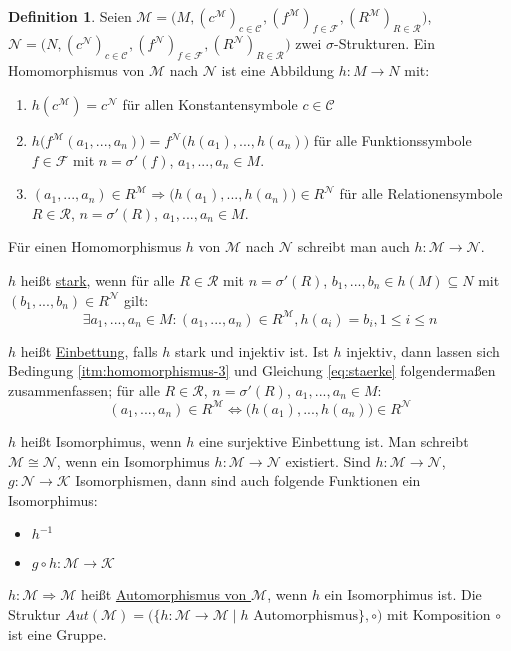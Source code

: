 \documentclass{article}
\theoremstyle{definition}
\newtheorem{dfn}{Definition}[section]
\theoremstyle{plain}
\newcommand{\m}[1]{\mathcal{#1}}
\newcommand{\struc}[3]{\big(#1, (c^{#2})_{c \in \m{C}_{#3}}, (f^{#2})_{f \in \m{F}_{#3}}, (R^{#2})_{R \in \m{R}_{#3}}\big)}
\begin{document}
    \begin{dfn}
        Seien $ \m{M} = \struc{M}{\m{M}}{} $, $ \m{N} = \struc{N}{\m{N}}{} $ zwei $ \sigma $-Strukturen.
        Ein Homomorphismus von $ \m{M} $ nach $ \m{N} $ ist eine Abbildung $ h : M \rightarrow N $ mit:
        \begin{enumerate}
            \item $ h(c^\m{M}) = c^\m{N} $ für allen Konstantensymbole $ c \in \m{C} $
            \item $ h\big(f^\m{M}(a_1, ..., a_n)\big) = f^\m{N}\big(h(a_1), ..., h(a_n)\big) $ für alle Funktionssymbole $ f \in \m{F} $ mit $ n = \sigma'(f) $, $ a_1, ..., a_n \in M $.
            \item \label{itm:homomorphismus-3} $ (a_1, ..., a_n) \in R^\m{M} \Rightarrow \big(h(a_1), ..., h(a_n)) \in R^\m{N} $ für alle Relationensymbole $ R \in \m{R} $, $ n = \sigma'(R) $, $ a_1, ..., a_n \in M $.
        \end{enumerate}

            Für einen Homomorphismus $ h $ von $ \m{M} $ nach $ \m{N} $ schreibt man auch $ h : \m{M} \rightarrow \m{N} $.

            $ h $ heißt \underline{stark}, wenn für alle $ R \in \m{R} $ mit $ n = \sigma'(R) $, $ b_1, ..., b_n \in h(M) \subseteq N $ mit $ (b_1, ..., b_n) \in R^\m{N} $ gilt:
            \begin{equation}
                \label{eq:staerke}
                \exists a_1, ..., a_n \in M : (a_1, ..., a_n) \in R^\m{M}, h(a_i) = b_i, 1 \leq i \leq n
            \end{equation}

            $ h $ heißt \underline{Einbettung}, falls $ h $ stark und injektiv ist.
            Ist $ h $ injektiv, dann lassen sich Bedingung \ref{itm:homomorphismus-3} und Gleichung \eqref{eq:staerke} folgendermaßen zusammenfassen; für alle $ R \in \m{R} $, $ n = \sigma'(R) $, $ a_1, ..., a_n \in M $:
            \begin{equation}
                (a_1, ..., a_n) \in R^\m{M} \Leftrightarrow \big(h(a_1), ..., h(a_n)\big) \in R^\m{N}
            \end{equation}

            $ h $ heißt Isomorphimus, wenn $ h $ eine surjektive Einbettung ist.
            Man schreibt $ \m{M} \cong \m{N} $, wenn ein Isomorphimus $ h : \m{M} \rightarrow \m{N} $ existiert.
            Sind $ h : \m{M} \rightarrow \m{N} $, $ g : \m{N} \rightarrow \m{K} $ Isomorphismen, dann sind auch folgende Funktionen ein Isomorphimus:
            \begin{itemize}
                \item $ h^{-1} $
                \item $ g \circ h : \m{M} \rightarrow \m{K} $
            \end{itemize}

            $ h : \m{M} \Rightarrow \m{M} $ heißt \underline{Automorphismus von $ \m{M} $}, wenn $ h $ ein Isomorphimus ist.
            Die Struktur $ Aut(\m{M}) = \big( \{ h : \m{M} \rightarrow \m{M} \mid h \text{ Automorphismus} \}, \circ \big) $ mit Komposition $ \circ $ ist eine Gruppe.
    \end{dfn}
\end{document}
